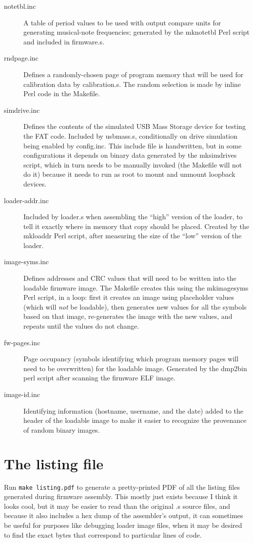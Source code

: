 \begin{description}
\item[notetbl.inc] A table of period values to be used with output compare
units for generating musical-note frequencies; generated by the mknotetbl
Perl script and included in firmware.s.

\item[rndpage.inc] Defines a randomly-chosen page of program memory that
will be used for calibration data by calibration.s.  The random selection is
made by inline Perl code in the Makefile.

\item[simdrive.inc] Defines the contents of the simulated USB Mass Storage
device for testing the FAT code.  Included by usbmass.s, conditionally on
drive simulation being enabled by config.inc.  This include file is
handwritten, but in some configurations it depends on binary data generated
by the mksimdrives script, which in turn needs to be manually invoked (the
Makefile will not do it) because it needs to run as root to mount and
unmount loopback devices.

\item[loader-addr.inc] Included by loader.s when assembling the ``high''
version of the loader, to tell it exactly where in memory that copy should
be placed.  Created by the mkloaddr Perl script, after measuring the size of
the ``low'' version of the loader.

\item[image-syms.inc]  Defines addresses and CRC values that will need to be
written into the loadable firmware image.  The Makefile creates this using
the mkimagesyms Perl script, in a loop:  first it creates an image using
placeholder values (which will \emph{not} be loadable), then generates new
values for all the symbols based on that image, re-generates the image with
the new values, and repeats until the values do not change.

\item[fw-pages.inc]  Page occupancy (symbols identifying which program
memory pages will need to be overwritten) for the loadable image.  Generated
by the dmp2bin perl script after scanning the firmware ELF image.

\item[image-id.inc]  Identifying information (hostname, username, and the
date) added to the header of the loadable image to make it easier to
recognize the provenance of random binary images.
\end{description}

\section{The listing file}

Run \texttt{make listing.pdf} to generate a pretty-printed PDF of all the
listing files generated during firmware assembly.  This mostly just exists
because I think it looks cool, but it may be easier to read than the
original .s source files, and because it also includes a hex dump of the
assembler's output, it can sometimes be useful for purposes like debugging
loader image files, when it may be desired to find the exact bytes that
correspond to particular lines of code.
